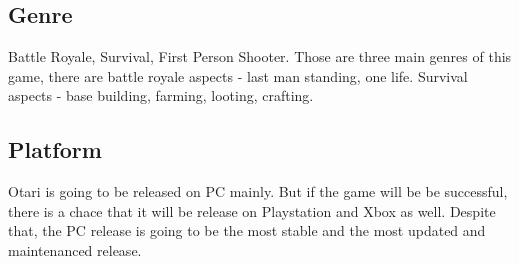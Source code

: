 \documentclass[a4paper,10pt,english]{article}
\begin{document}
\subsection*{Genre}
Battle Royale, Survival, First Person Shooter. Those are three main genres of this game, there are battle royale aspects - last man standing, one life. Survival aspects - base building, farming, looting, crafting.

\subsection*{Platform}
Otari is going to be released on PC mainly. But if the game will be be successful, there is a chace that it will be release on Playstation and Xbox as well.
Despite that, the PC release is going to be the most stable and the most updated and maintenanced release.
\newpage
\end{document}
